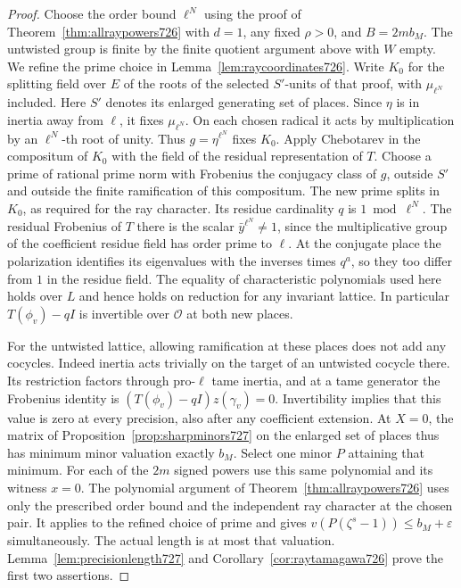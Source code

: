 \documentclass[a4paper,11pt]{article}
\theoremstyle{definition}
\theoremstyle{remark}
\numberwithin{equation}{section}
\begin{document}
\begin{proof}
Choose the order bound \(\ell^N\) using the proof of
Theorem~\ref{thm:allraypowers726} with \(d=1\), any fixed
\(\rho>0\), and \(B=2m b_M\). The untwisted group is finite by the
finite quotient argument above with \(W\) empty. We refine the
prime choice in Lemma~\ref{lem:raycoordinates726}. Write \(K_0\)
for the splitting field over \(E\) of the roots of the selected
\(S'\)-units of that proof, with \(\mu_{\ell^N}\) included. Here \(S'\)
denotes its enlarged generating set of places. Since \(\eta\) is in
inertia away from \(\ell\), it fixes \(\mu_{\ell^N}\). On each chosen
radical it acts by multiplication by an \(\ell^N\)-th root of unity.
Thus \(g=\eta^{\ell^N}\) fixes \(K_0\). Apply Chebotarev in the
compositum of \(K_0\) with the field of the residual representation
of \(T\). Choose a prime of rational prime norm with Frobenius the
conjugacy class of \(g\), outside \(S'\) and outside the finite
ramification of this compositum. The new prime splits in \(K_0\),
as required for the ray character. Its residue cardinality \(q\) is
\(1\bmod\ell^N\). The residual Frobenius of \(T\) there is the scalar
\(\bar y^{\ell^N}\ne1\), since the multiplicative group of the
coefficient residue field has order prime to \(\ell\). At the conjugate
place the polarization identifies its eigenvalues with the inverses
times \(q^a\), so they too differ from \(1\) in the residue field.
The equality of characteristic polynomials used here holds over \(L\)
and hence holds on reduction for any invariant lattice. In particular
\(T(\phi_v)-qI\) is invertible over \(\mathcal O\) at both new places.

For the untwisted lattice, allowing ramification at these places does
not add any cocycles. Indeed inertia acts trivially on the target of
an untwisted cocycle there. Its restriction factors through pro-\(\ell\)
tame inertia, and at a tame generator the Frobenius identity is
\((T(\phi_v)-qI)z(\gamma_v)=0\). Invertibility implies that this
value is zero at every precision, also after any coefficient extension.
At \(X=0\), the matrix of Proposition~\ref{prop:sharpminors727} on the
enlarged set of places thus has minimum minor valuation exactly
\(b_M\). Select one minor \(P\) attaining that minimum. For each
of the \(2m\) signed powers use this same polynomial and its witness
\(x=0\). The polynomial argument of Theorem~\ref{thm:allraypowers726}
uses only the prescribed order bound and the independent ray
character at the chosen pair. It applies to the refined choice of
prime and gives \(v(P(\zeta^s-1))\le b_M+\varepsilon\) simultaneously.
The actual length is at most that valuation. Lemma~\ref{lem:precisionlength727}
and Corollary~\ref{cor:raytamagawa726} prove the first two assertions.


\end{proof}
\end{document}
